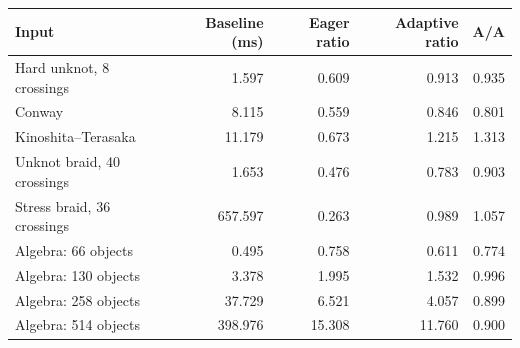 \begin{tabular}{@{}lrrrr@{}}
\toprule
Input & Baseline (ms) & Eager ratio & Adaptive ratio & A/A \\
\midrule
Hard unknot, 8 crossings & 1.597 & 0.609 & 0.913 & 0.935 \\
Conway & 8.115 & 0.559 & 0.846 & 0.801 \\
Kinoshita--Terasaka & 11.179 & 0.673 & 1.215 & 1.313 \\
Unknot braid, 40 crossings & 1.653 & 0.476 & 0.783 & 0.903 \\
Stress braid, 36 crossings & 657.597 & 0.263 & 0.989 & 1.057 \\
Algebra: 66 objects & 0.495 & 0.758 & 0.611 & 0.774 \\
Algebra: 130 objects & 3.378 & 1.995 & 1.532 & 0.996 \\
Algebra: 258 objects & 37.729 & 6.521 & 4.057 & 0.899 \\
Algebra: 514 objects & 398.976 & 15.308 & 11.760 & 0.900 \\
\bottomrule
\end{tabular}
